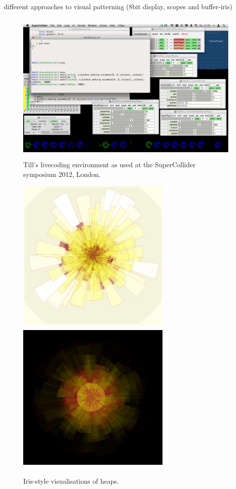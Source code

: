 \documentclass[letterpaper, 12pt]{article}
\begin{document}
different approaches to visual patterning (8bit display, scopes and buffer-iris)


\begin{figure}
	\centering
		\includegraphics[height=3in]{2012-SuperColliderSymposiumLiveCodingEnvironment-till}
	\caption{Till's livecoding environment as used at the SuperCollider symposium 2012, London.}
	\label{fig:fig_2012-SuperColliderSymposiumLiveCodingEnvironment-till}
\end{figure}


\begin{figure}
	\centering
		\includegraphics[width=3in, height=3in]{2013-heapIris-white}
		\includegraphics[width=3in, height=3in]{2013-heapIris-black}
	\caption{Iris-style visualisations of heaps.}
	\label{fig:fig_2013-heapIris-white}
\end{figure}
\end{document}
